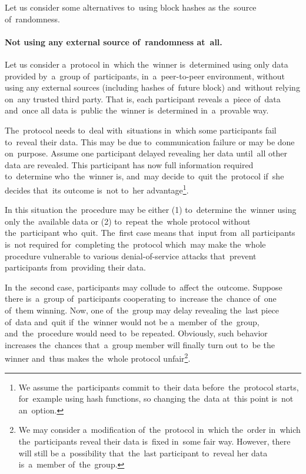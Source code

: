 \documentclass[a4paper]{article}
\begin{document}
    Let us consider some alternatives to~using block hashes as the~source of~randomness.

    \paragraph{Not using any external source of~randomness at~all.}
    Let us consider a~protocol in~which the~winner is~determined using only data provided by~a~group of~participants,
    in~a~peer-to-peer environment, without using any external sources (including hashes of~future block) and~without
    relying on~any trusted third party. That is, each participant reveals a~piece of~data and~once all data is~public
    the~winner is~determined in~a~provable way.

    The~protocol needs to~deal with~situations in~which some participants fail to~reveal their data. This may be due
    to~communication failure or may be done on~purpose. Assume one participant delayed revealing her data until~all
    other data are revealed. This participant has now full information required to~determine who~the~winner is,
    and~may decide to~quit the~protocol if~she decides that~its outcome is~not to~her advantage\footnote{We assume
    the~participants commit to~their data before~the~protocol starts, for~example using hash functions,
    so changing the~data at~this point is~not an~option.}.

    In this situation the~procedure may be either (1) to~determine the~winner using only the~available data or (2)
    to~repeat the~whole protocol without the~participant who~quit. The~first case means that~input from~all
    participants is~not required for~completing the~protocol which~may make the~whole procedure vulnerable to
    various denial-of-service attacks that~prevent participants from~providing their data.

    In the~second case, participants may collude to~affect the~outcome. Suppose there is~a~group of~participants
    cooperating to~increase the~chance of~one of~them winning. Now, one of~the~group may delay revealing the~last
    piece of~data and~quit if~the~winner would not be a~member of~the~group, and~the~procedure would need to~be
    repeated. Obviously, such behavior increases the~chances that~a~group member will finally turn out to~be the
    winner and~thus makes the~whole protocol unfair\footnote{We may consider a~modification of~the~protocol in~which
    the~order in~which the~participants reveal their data is~fixed in~some fair way. However, there will still be
    a~possibility that~the~last participant to~reveal her data is~a~member of~the~group.}.
\end{document}
